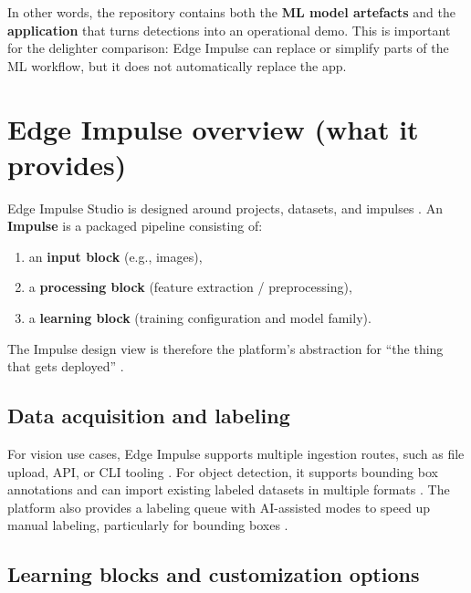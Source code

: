 \noindent
In other words, the repository contains both the \textbf{ML model artefacts} and the \textbf{application} that turns detections into an operational demo.
This is important for the delighter comparison: Edge Impulse can replace or simplify parts of the ML workflow, but it does not automatically replace the app.

\section{Edge Impulse overview (what it provides)}
\label{sec:edge_impulse_overview}

\noindent
Edge Impulse Studio is designed around projects, datasets, and impulses \cite{EdgeImpulseStudioOverview}.
An \textbf{Impulse} is a packaged pipeline consisting of:
\begin{enumerate}
	\item an \textbf{input block} (e.g., images),
	\item a \textbf{processing block} (feature extraction / preprocessing),
	\item a \textbf{learning block} (training configuration and model family).
\end{enumerate}
\noindent
The Impulse design view is therefore the platform's abstraction for ``the thing that gets deployed'' \cite{EdgeImpulseImpulseDesign}.

\subsection{Data acquisition and labeling}

\noindent
For vision use cases, Edge Impulse supports multiple ingestion routes, such as file upload, API, or CLI tooling \cite{EdgeImpulseDataAcquisition}.
For object detection, it supports bounding box annotations and can import existing labeled datasets in multiple formats \cite{EdgeImpulseUploader,EdgeImpulseObjectDetectionLabelFormats}.
The platform also provides a labeling queue with AI-assisted modes to speed up manual labeling, particularly for bounding boxes \cite{EdgeImpulseLabelingQueue}.

\subsection{Learning blocks and customization options}

